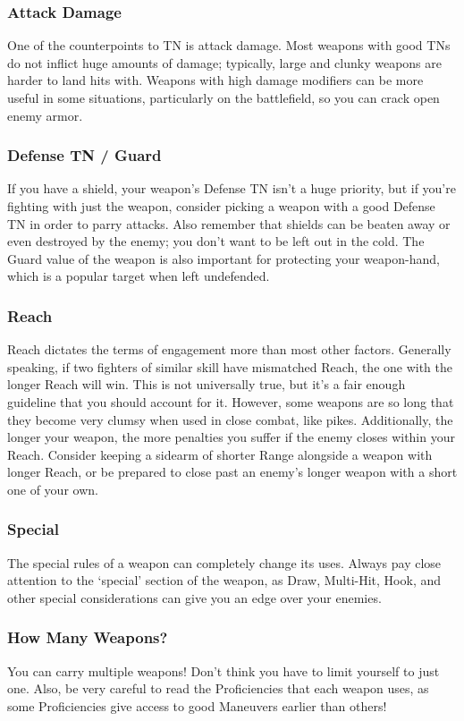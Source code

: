 \documentclass[oneside,11pt,english]{book}
\begin{document}
\subsubsection{Attack Damage}
One of the counterpoints to TN is attack damage. Most weapons with good TNs do not inflict huge amounts of 
damage; typically, large and clunky weapons are harder to land hits with. Weapons with high damage modifiers can be
more useful in some situations, particularly on the battlefield, so you can crack open enemy armor.
\subsubsection{Defense TN / Guard}
If you have a shield, your weapon’s Defense TN isn’t a huge priority, but if you’re fighting with just the weapon, 
consider picking a weapon with a good Defense TN in order to parry attacks. Also remember that shields can be 
beaten away or even destroyed by the enemy; you don’t want to be left out in the cold. The Guard value of the weapon
is also important for protecting your weapon-hand, which is a popular target when left undefended.
\subsubsection{Reach}
Reach dictates the terms of engagement more than most other factors. Generally speaking, if two fighters of similar 
skill have mismatched Reach, the one with the longer Reach will win. This is not universally true, but it’s a fair 
enough guideline that you should account for it. However, some weapons are so long that they become very clumsy 
when used in close combat, like pikes. Additionally, the longer your weapon, the more penalties you suffer if the 
enemy closes within your Reach. Consider keeping a sidearm of shorter Range alongside a weapon with longer 
Reach, or be prepared to close past an enemy’s longer weapon with a short one of your own.
\subsubsection{Special}
The special rules of a weapon can completely change its uses. Always pay close attention to the ‘special’ section of the
weapon, as Draw, Multi-Hit, Hook, and other special considerations can give you an edge over your enemies.

\subsubsection{How Many Weapons?}
You can carry multiple weapons! Don’t think you have to limit yourself to just one. Also, be very careful to read the 
Proficiencies that each weapon uses, as some Proficiencies give access to good Maneuvers earlier than others!
\end{document}
